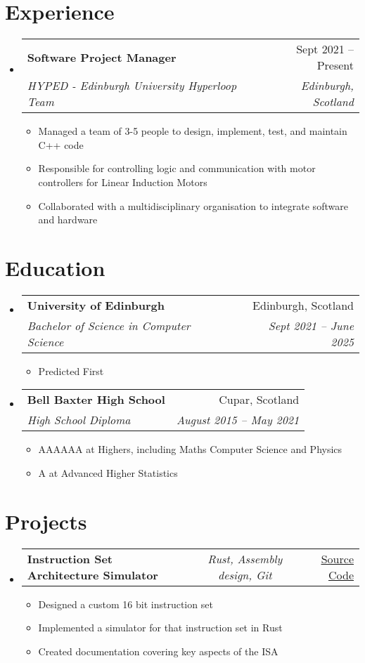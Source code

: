 \documentclass[a4paper,11pt]{article}
\makeatletter
\newcommand{\resumeItem}[1]{
  \item\small{#1}
}
\newcommand{\resumeItemListStart}{\begin{itemize}[rightmargin=0.11in]}
\newcommand{\resumeItemListEnd}{\end{itemize}}
\newcommand{\resumeTrioHeading}[3]{
  \item\small{
    \begin{tabular*}{0.96\textwidth}[t]{
      l@{\extracolsep{\fill}}c@{\extracolsep{\fill}}r
    }
      \textbf{#1} & \textit{#2} & #3
    \end{tabular*}
  }
}
\newcommand{\resumeQuadHeading}[4]{
  \item
  \begin{tabular*}{0.96\textwidth}[t]{l@{\extracolsep{\fill}}r}
    \textbf{#1} & #2 \\
    \textit{\small#3} & \textit{\small #4} \\
  \end{tabular*}
}
\newcommand{\resumeHeadingListStart}{
  \begin{itemize}[leftmargin=0.15in, label={}]
}
\newcommand{\resumeHeadingListEnd}{\end{itemize}}
\makeatother
\begin{document}

\section{Experience}
\resumeHeadingListStart{}
  \resumeQuadHeading{Software Project Manager}{Sept 2021 -- Present}
  {HYPED - Edinburgh University Hyperloop Team}{Edinburgh, Scotland}
    \resumeItemListStart{}
      \resumeItem{Managed a team of 3-5 people to design, implement, test, and maintain C++ code}
      \resumeItem{Responsible for controlling logic and communication with motor controllers for Linear Induction Motors}
      \resumeItem{Collaborated with a multidisciplinary organisation to integrate software and hardware}
    \resumeItemListEnd{}
\resumeHeadingListEnd{}



\section{Education}
  \resumeHeadingListStart{}
    \resumeQuadHeading{University of Edinburgh}{Edinburgh, Scotland}
    {Bachelor of Science in Computer Science}{Sept 2021 -- June 2025}
      \resumeItemListStart{}
        \resumeItem{Predicted First}
      \resumeItemListEnd{}
    \resumeQuadHeading{Bell Baxter High School}{Cupar, Scotland}
    {High School Diploma}{August 2015 -- May 2021}
        \resumeItemListStart{}
            \resumeItem{AAAAAA at Highers, including Maths Computer Science and Physics}
            \resumeItem{A at Advanced Higher Statistics}
        \resumeItemListEnd{}
  \resumeHeadingListEnd{}



\section{Projects}
  \resumeHeadingListStart{}
    \resumeTrioHeading{Instruction Set Architecture Simulator}{Rust, Assembly design, Git}{\href{https://github.com/TomLonergan03/isa}{\uline{Source Code}}}
      \resumeItemListStart{}
        \resumeItem{Designed a custom 16 bit instruction set}
        \resumeItem{Implemented a simulator for that instruction set in Rust}
        \resumeItem{Created documentation covering key aspects of the ISA}
      \resumeItemListEnd{}
  \resumeHeadingListEnd{}
\end{document}
